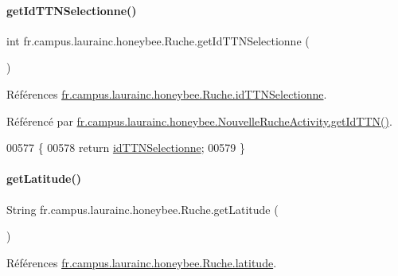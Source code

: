 \paragraph{\texorpdfstring{get\+Id\+T\+T\+N\+Selectionne()}{getIdTTNSelectionne()}}
{\footnotesize\ttfamily int fr.\+campus.\+laurainc.\+honeybee.\+Ruche.\+get\+Id\+T\+T\+N\+Selectionne (\begin{DoxyParamCaption}{ }\end{DoxyParamCaption})}



Références \hyperlink{classfr_1_1campus_1_1laurainc_1_1honeybee_1_1_ruche_a4f7b012e98299ef15fbce3b60930fefb}{fr.\+campus.\+laurainc.\+honeybee.\+Ruche.\+id\+T\+T\+N\+Selectionne}.



Référencé par \hyperlink{classfr_1_1campus_1_1laurainc_1_1honeybee_1_1_nouvelle_ruche_activity_a83e03af4d233629129a31cd78f762551}{fr.\+campus.\+laurainc.\+honeybee.\+Nouvelle\+Ruche\+Activity.\+get\+Id\+T\+T\+N()}.


\begin{DoxyCode}
00577                                      \{
00578         \textcolor{keywordflow}{return} \hyperlink{classfr_1_1campus_1_1laurainc_1_1honeybee_1_1_ruche_a4f7b012e98299ef15fbce3b60930fefb}{idTTNSelectionne};
00579     \}
\end{DoxyCode}
\mbox{\label{classfr_1_1campus_1_1laurainc_1_1honeybee_1_1_ruche_a3f03f6958a9251f72e60e45a6b8eb65c}} 
\paragraph{\texorpdfstring{get\+Latitude()}{getLatitude()}}
{\footnotesize\ttfamily String fr.\+campus.\+laurainc.\+honeybee.\+Ruche.\+get\+Latitude (\begin{DoxyParamCaption}{ }\end{DoxyParamCaption})}



Références \hyperlink{classfr_1_1campus_1_1laurainc_1_1honeybee_1_1_ruche_a6898723eb97e6f32cbf2c63032f8aec4}{fr.\+campus.\+laurainc.\+honeybee.\+Ruche.\+latitude}.




